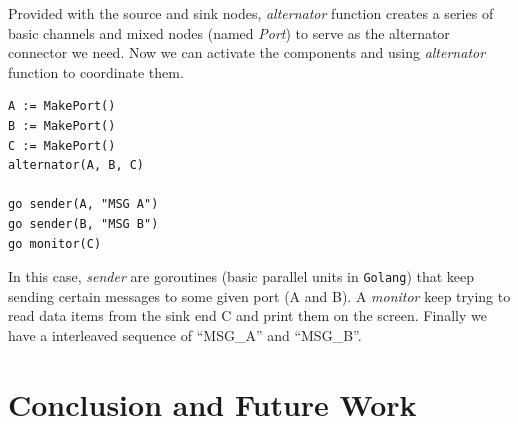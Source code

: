 \documentclass[conference, a4paper]{IEEEtran}
\begin{document}
Provided with the source and sink nodes, \emph{alternator} function creates a series of basic
channels and mixed nodes (named \emph{Port}) to serve as the alternator connector we need. Now we
can activate the components and using \emph{alternator} function to coordinate them.

\begin{lstlisting}
A := MakePort()
B := MakePort()
C := MakePort()
alternator(A, B, C)

go sender(A, "MSG A")
go sender(B, "MSG B")
go monitor(C)
\end{lstlisting}

In this case, \emph{sender} are goroutines (basic parallel units in \texttt{Golang}) that keep
sending certain messages to some given port (A and B). A \emph{monitor} keep trying to read data
items from the sink end C and print them on the screen. Finally we have a interleaved sequence of
``MSG\_A'' and ``MSG\_B''.
 
\section{Conclusion and Future Work}






\listoftodos
\end{document}
